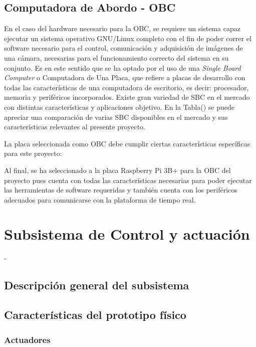     \subsection{Computadora de Abordo - OBC}

    En el caso del hardware necesario para la OBC, se requiere un sistema capaz ejecutar un sistema operativo GNU/Linux completo 
    con el fin de poder correr el software necesario para el control, comunicación y adquisición de imágenes de una cámara, necesarias
    para el funcionamiento correcto del sistema en su conjunto. Es en este sentido que se ha optado por el uso de una \textit{Single Board Computer}
    o Computadora de Una Placa, que refiere a placas de desarrollo con todas las características de una computadora de escritorio, es decir:
    procesador, memoria y periféricos incorporados. Existe gran variedad de SBC en el mercado con distintas características y aplicaciones 
    objetivo. En la Tabla() se puede apreciar una comparación de varias SBC disponibles en el mercado y sus características 
    relevantes al presente proyecto.


    La placa seleccionada como OBC debe cumplir ciertas características específicas para este proyecto:



    Al final, se ha seleccionado a la placa Raspberry Pi 3B+ para la OBC del proyecto pues cuenta con todas las características 
    necesarias para poder ejecutar las herramientas de software requeridas y también cuenta con los periféricos adecuados para 
    comunicarse con la plataforma de tiempo real.



\section{Subsistema de Control y actuación}
-
    \subsection{Descripción general del subsistema}

    \subsection{Características del prototipo físico}
        \subsubsection{Actuadores}

